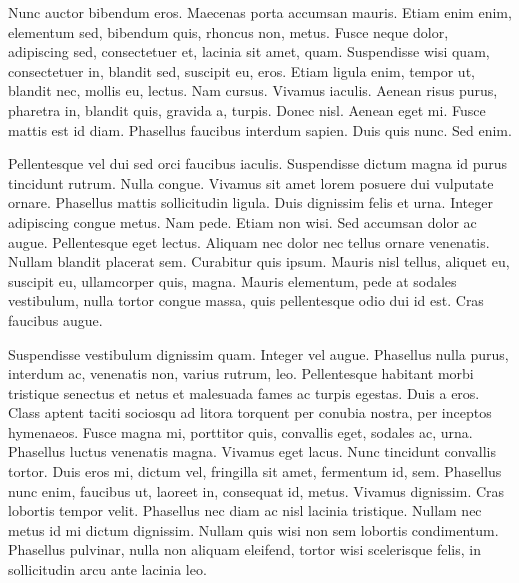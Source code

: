 Nunc auctor bibendum eros. Maecenas porta accumsan mauris. Etiam enim enim, elementum sed, bibendum quis, rhoncus non, metus. Fusce neque dolor, adipiscing sed, consectetuer et, lacinia sit amet, quam. Suspendisse wisi quam, consectetuer in, blandit sed, suscipit eu, eros. Etiam ligula enim, tempor ut, blandit nec, mollis eu, lectus. Nam cursus. Vivamus iaculis. Aenean risus purus, pharetra in, blandit quis, gravida a, turpis. Donec nisl. Aenean eget mi. Fusce mattis est id diam. Phasellus faucibus interdum sapien. Duis quis nunc. Sed enim.

Pellentesque vel dui sed orci faucibus iaculis. Suspendisse dictum magna id purus tincidunt rutrum. Nulla congue. Vivamus sit amet lorem posuere dui vulputate ornare. Phasellus mattis sollicitudin ligula. Duis dignissim felis et urna. Integer adipiscing congue metus. Nam pede. Etiam non wisi. Sed accumsan dolor ac augue. Pellentesque eget lectus. Aliquam nec dolor nec tellus ornare venenatis. Nullam blandit placerat sem. Curabitur quis ipsum. Mauris nisl tellus, aliquet eu, suscipit eu, ullamcorper quis, magna. Mauris elementum, pede at sodales vestibulum, nulla tortor congue massa, quis pellentesque odio dui id est. Cras faucibus augue.

Suspendisse vestibulum dignissim quam. Integer vel augue. Phasellus nulla purus, interdum ac, venenatis non, varius rutrum, leo. Pellentesque habitant morbi tristique senectus et netus et malesuada fames ac turpis egestas. Duis a eros. Class aptent taciti sociosqu ad litora torquent per conubia nostra, per inceptos hymenaeos. Fusce magna mi, porttitor quis, convallis eget, sodales ac, urna. Phasellus luctus venenatis magna. Vivamus eget lacus. Nunc tincidunt convallis tortor. Duis eros mi, dictum vel, fringilla sit amet, fermentum id, sem. Phasellus nunc enim, faucibus ut, laoreet in, consequat id, metus. Vivamus dignissim. Cras lobortis tempor velit. Phasellus nec diam ac nisl lacinia tristique. Nullam nec metus id mi dictum dignissim. Nullam quis wisi non sem lobortis condimentum. Phasellus pulvinar, nulla non aliquam eleifend, tortor wisi scelerisque felis, in sollicitudin arcu ante lacinia leo.
